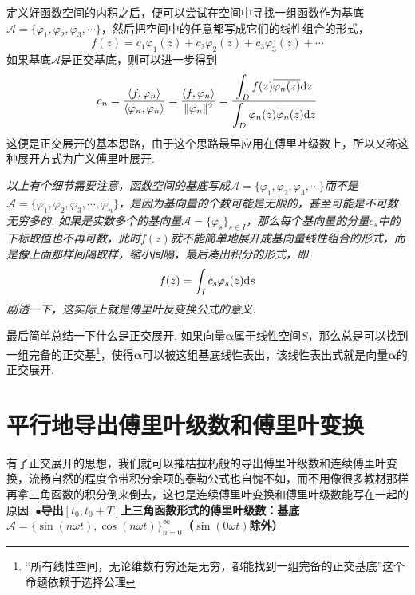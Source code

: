 \documentclass[main.tex]{subfiles}
\begin{document}
定义好函数空间的内积之后，便可以尝试在空间中寻找一组函数作为基底\(\mathcal{A}=\{\varphi_1,\varphi_2,\varphi_3,\cdots\}\)，然后把空间中的任意都写成它们的线性组合的形式，
\[f(z) = c_1\varphi_1(z)+c_2\varphi_2(z)+c_3\varphi_3(z)+\cdots\]
如果基底\(\mathcal{A}\)是正交基底，则可以进一步得到
\[c_n=\frac{\langle f,\varphi_n \rangle}{\langle \varphi_n,\varphi_n \rangle} = \frac{\langle f,\varphi_n \rangle}{\|\varphi_n\|^2} = \frac{\displaystyle{\int_{D} f(z)\overline{\varphi_n(z)}{\rm d}z}}{\displaystyle{\int_{D}\varphi_n(z)\overline{\varphi_n(z)}{\rm d}z}}\]
这便是正交展开的基本思路，由于这个思路最早应用在傅里叶级数上，所以又称这种展开方式为\uline{广义傅里叶展开}.

\textit{
    以上有个细节需要注意，函数空间的基底写成\(\mathcal{A}=\{\varphi_1,\varphi_2,\varphi_3,\cdots\}\)而不是\(\mathcal{A}=\{\varphi_1,\varphi_2,\varphi_3,\cdots,\varphi_n\}\)，是因为基向量的个数可能是无限的，甚至可能是不可数无穷多的. 如果是实数多个的基向量\(\mathcal{A}=\{\varphi_s\}_{s \in I}\)，那么每个基向量的分量\(c_s\)中的下标取值也不再可数，此时\(f(z)\)就不能简单地展开成基向量线性组合的形式，而是像上面那样间隔取样，缩小间隔，最后凑出积分的形式，即
    \[f(z)=\int_{I}c_s\varphi_s(z){\rm d}s\]
    剧透一下，这实际上就是傅里叶反变换公式的意义.
}

最后简单总结一下什么是正交展开. 如果向量\(\bm{\alpha}\)属于线性空间\(S\)，那么总是可以找到一组完备的正交基\footnote{“所有线性空间，无论维数有穷还是无穷，都能找到一组完备的正交基底”这个命题依赖于选择公理}，使得\(\bm{\alpha}\)可以被这组基底线性表出，该线性表出式就是向量\(\bm{\alpha}\)的正交展开.

\section{平行地导出傅里叶级数和傅里叶变换}

有了正交展开的思想，我们就可以摧枯拉朽般的导出傅里叶级数和连续傅里叶变换，流畅自然的程度令带积分余项的泰勒公式也自愧不如，而不用像很多教材那样再拿三角函数的积分倒来倒去，这也是连续傅里叶变换和傅里叶级数能写在一起的原因.
\vspace{1cm}
\newline
\noindent \textbf{
\(\bullet\)导出\([t_0, t_0+T]\)上三角函数形式的傅里叶级数：基底\(\mathcal{A}=\{\sin(n\omega t), \cos(n\omega t)\}_{n=0}^{\infty}\)（\(\sin(0\omega t)\)除外）
}
\end{document}
